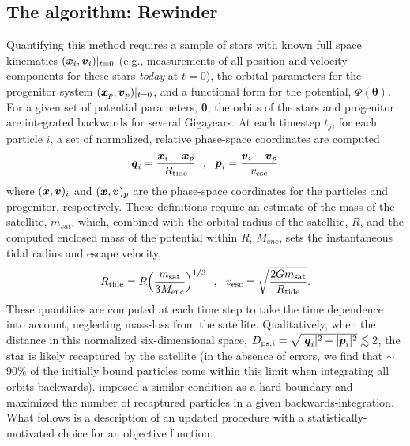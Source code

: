 \subsection{The algorithm: Rewinder}
Quantifying this method requires a sample of stars with known full
space kinematics $(\boldsymbol{x}_{i}, \boldsymbol{v}_{i})|_{t=0}$ (e.g., measurements
of all position and velocity components for these stars \emph{today}
at $t=0$), the orbital parameters for the progenitor system
$(\boldsymbol{x}_p, \boldsymbol{v}_p)|_{t=0}$, and a functional form for the
potential, $\Phi({\boldsymbol\theta})$. For a given set of potential
parameters, $\boldsymbol\theta$, the orbits of the stars and
progenitor are integrated backwards for several Gigayears. At
each timestep $t_j$, for each particle $i$, a set of normalized,
relative phase-space coordinates are computed
\begin{equation}
  \boldsymbol{q}_{i} = \frac{\boldsymbol{x}_{i} -
    \boldsymbol{x}_{p}}{R_{\rm tide}}\,\,\,\,,\,\,\,\,\boldsymbol{p}_{i} = \frac{\boldsymbol{v}_{i} -
    \boldsymbol{v}_{p}}{v_{\rm esc}}
\end{equation}
where $(\boldsymbol{x},\boldsymbol{v})_{i}$ and $(\boldsymbol{x},\boldsymbol{v})_{p}$ are the
phase-space coordinates for the particles and progenitor,
respectively. These definitions require an estimate of the mass of the
satellite, $m_{sat}$, which, combined with the orbital radius of the
satellite, $R$, and the computed enclosed mass of the potential within
$R$, $M_{enc}$, sets the instantaneous tidal radius and escape
velocity,
\begin{equation}
  R_{\rm tide}=R\Big(\frac{m_{\rm sat}}{3M_{\rm enc}}\Big)^{1/3}\,\,\,\,,\,\,\,\,
  v_{\rm esc}=\sqrt{\frac{2Gm_{\rm sat}}{R_{\rm tide}}}.
\end{equation}
These quantities are computed at each time step to take the time 
dependence into account, neglecting mass-loss from the satellite.
Qualitatively, when the distance in this normalized six-dimensional
space, $D_{{\rm ps},i}=\sqrt{|\boldsymbol{q}_{i}|^2+|\boldsymbol{p}_{i}|^2} \lesssim 2$, 
the star is likely recaptured by the satellite (in the absence of errors,
 we find that $\sim$90\% of the initially bound particles come within
 this limit when integrating all orbits backwards). \citet{johnston99a} 
 imposed a similar condition as a hard boundary and maximized the 
number of recaptured particles in a given backwards-integration.
What follows is a description of an updated procedure with a 
statistically-motivated choice for an objective function.

